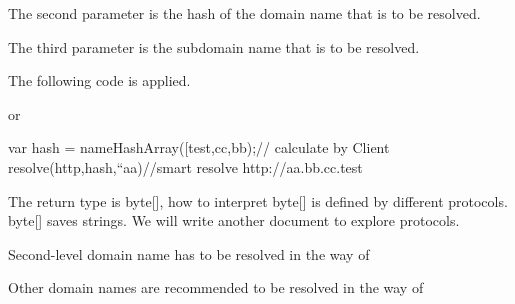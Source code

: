 \documentclass[letterpaper,10pt,english]{sphinxmanual}
\begin{document}
The second parameter is the hash of the domain name that is to be resolved.

The third parameter is the subdomain name that is to be resolved.

The following code is applied.

%
\begin{sphinxVerbatim}[commandchars=\\\{\}]
   \PYG{p}{[}\PYG{p}{]}  
  
\end{sphinxVerbatim}

or

%
\begin{sphinxVerbatim}[commandchars=\\\{\}]
var hash = nameHashArray([\PYGZdq{}test\PYGZdq{},\PYGZdq{}cc\PYGZdq{},\PYGZdq{}bb\PYGZdq{});// calculate by Client
resolve(\PYGZdq{}http\PYGZdq{},hash,“aa\PYGZdq{})//smart resolve http://aa.bb.cc.test
\end{sphinxVerbatim}

The return type is byte{[}{]}, how to interpret byte{[}{]} is defined by different protocols.
byte{[}{]} saves strings. We will write another document to explore protocols.

Second-level domain name has to be resolved in the way of

%
\begin{sphinxVerbatim}[commandchars=\\\{\}]
\end{sphinxVerbatim}

Other domain names are recommended to be resolved in the way of
\end{document}
